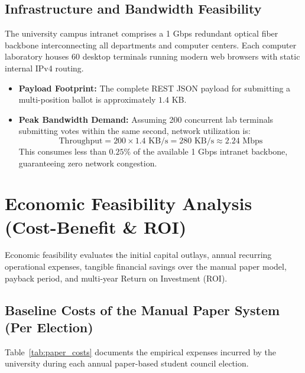 \documentclass[12pt,a4paper,oneside]{report}
\begin{document}
\subsection{Infrastructure and Bandwidth Feasibility}
The university campus intranet comprises a 1 Gbps redundant optical fiber backbone interconnecting all departments and computer centers. Each computer laboratory houses 60 desktop terminals running modern web browsers with static internal IPv4 routing.
\begin{itemize}
    \item \textbf{Payload Footprint:} The complete REST JSON payload for submitting a multi-position ballot is approximately $1.4\text{ KB}$.
    \item \textbf{Peak Bandwidth Demand:} Assuming 200 concurrent lab terminals submitting votes within the same second, network utilization is:
    \begin{equation}
        \text{Throughput} = 200 \times 1.4\text{ KB/s} = 280\text{ KB/s} \approx 2.24\text{ Mbps}
    \end{equation}
    This consumes less than $0.25\%$ of the available 1 Gbps intranet backbone, guaranteeing zero network congestion.
\end{itemize}

\section{Economic Feasibility Analysis (Cost-Benefit \& ROI)}
Economic feasibility evaluates the initial capital outlays, annual recurring operational expenses, tangible financial savings over the manual paper model, payback period, and multi-year Return on Investment (ROI).

\subsection{Baseline Costs of the Manual Paper System (Per Election)}
Table~\ref{tab:paper_costs} documents the empirical expenses incurred by the university during each annual paper-based student council election.
\end{document}
